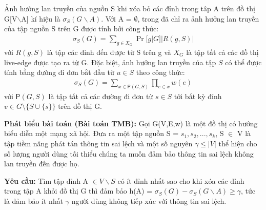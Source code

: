 Ảnh hưởng lan truyền của nguồn S khi xóa bỏ các đỉnh trong tâp A trên đồ thị G[V$\backslash$A] kí hiệu là $\sigma_{S}(G \backslash A)$. Với A = $\emptyset$, trong \cite{kemple1} đã chỉ ra ảnh hưởng lan truyền của tập nguồn S trên G được tính bởi công thức:
\begin{align}
\sigma_S(G)=\sum_{g \in X_G}{\Pr[g|G]|R(g, S)|}
\label{inf_cal}
\end{align}
với $R(g, S)$ là tập các đỉnh đến được từ S trên g và $X_G$ là tập tất cả các đồ thị live-edge được tạo ra từ G. Đặc biệt, ảnh hưởng lan truyền của tập $S$ có thể được tính bằng đường đi đơn bắt đầu từ $u \in S$ theo công thức: 
\begin{align}
\sigma_{S}(G)=\sum_{x \in \mathsf{P}(G, S)} \prod_{e \in x}w(e)
\label{inf_path}
\end{align} 				
với $\mathsf{P}(G, S)$ là tập tất cả các đường đi đơn từ $s \in S$ tới bất kỳ đỉnh $v \in G \setminus \{S \cup \{s\} \} $ trên đồ thị G.		

\textbf{Phát biểu bài toán (Bài toán TMB):} Gọi G(V,E,w) là một đồ thị có hướng biểu diễn một mạng xã hội. Đưa ra một tập nguồn S = {$s_{1}, s_{2}, ... , s_{k}$}, S $\in$ V là tập tiềm năng phát tán thông tin sai lệch và một số nguyên $\gamma \leq | V |$ thể hiện cho số lượng người dùng tối thiểu chúng ta muốn đảm bảo thông tin sai lệch không lan truyền đến được họ.

\textbf{Yêu cầu:} Tìm tập đỉnh A $\in V \backslash S$ có ít đỉnh nhất sao cho khi xóa các đỉnh trong tập A khỏi đồ thị G thì đảm bảo h(A) = $\sigma_{S}(G) - \sigma_{S}(G \backslash A) \geq \gamma$, tức là đảm bảo ít nhất $\gamma$ người dùng không tiếp xúc với thông tin sai lệch.
